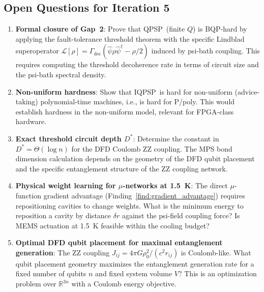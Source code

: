 \documentclass[11pt]{article}
\theoremstyle{definition}
\theoremstyle{remark}
\newcommand{\QPSP}{\textsc{QPSP}}
\newcommand{\IQPSP}{\textsc{IQPSP}}
\begin{document}
\subsection{Open Questions for Iteration 5}

\begin{enumerate}
\item \textbf{Formal closure of Gap~2}: Prove that \QPSP\ (finite $Q$)
  is BQP-hard by applying the fault-tolerance threshold theorem with the
  specific Lindblad superoperator $\mathcal{L}[\rho] = \Gamma_{\mathrm{dec}}
  (\hat{\psi}\rho\hat{\psi}^\dagger - \rho/2)$ induced by psi-bath coupling.
  This requires computing the threshold decoherence rate in terms of
  circuit size and the psi-bath spectral density.

\item \textbf{Non-uniform hardness}: Show that \IQPSP\ is hard for
  non-uniform (advice-taking) polynomial-time machines, i.e., is hard
  for P/poly. This would establish hardness in the non-uniform model,
  relevant for FPGA-class hardware.

\item \textbf{Exact threshold circuit depth $D^*$}: Determine the constant
  in $D^* = \Theta(\log n)$ for the DFD Coulomb ZZ coupling. The MPS
  bond dimension calculation depends on the geometry of the DFD qubit
  placement and the specific entanglement structure of the ZZ coupling
  network.

\item \textbf{Physical weight learning for $\mu$-networks at 1.5~K}:
  The direct $\mu$-function gradient advantage (Finding~\ref{find:gradient_advantage})
  requires repositioning cavities to change weights. What is the minimum
  energy to reposition a cavity by distance $\delta r$ against the psi-field
  coupling force? Is MEMS actuation at 1.5~K feasible within the
  cooling budget?

\item \textbf{Optimal DFD qubit placement for maximal entanglement
  generation}: The ZZ coupling $J_{ij} = 4\pi G\rho_0^2/(c^2 r_{ij})$
  is Coulomb-like. What qubit placement geometry maximizes the entanglement
  generation rate for a fixed number of qubits $n$ and fixed system
  volume $V$? This is an optimization problem over $\mathbb{R}^{3n}$ with
  a Coulomb energy objective.
\end{enumerate}
\end{document}
